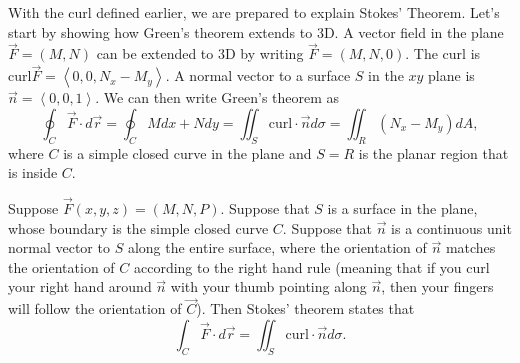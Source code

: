 %

With the curl defined earlier, we are prepared to explain Stokes' Theorem.  Let's start by showing how Green's theorem extends to 3D.
A vector field in the plane $\vec F = \left(M,N\right)$ can be extended to 3D by writing $\vec F = \left(M,N,0\right)$.  The curl is $\text{curl}\vec F = \left<0,0,N_x-M_y\right>$.  A normal vector to a surface $S$ in the $xy$ plane is $\vec n = \left<0,0,1\right>$. We can then write Green's theorem as $$\oint_C\vec F\cdot d\vec r = \oint_C Mdx+Ndy = \iint_S \text{curl}\cdot \vec n d\sigma = \iint_R \left(N_x-M_y\right) dA, $$ where $C$ is a simple closed curve in the plane and $S=R$ is the planar region that is inside $C$. 

\begin{theorem}
Suppose $\vec F(x,y,z) = (M,N,P)$.  Suppose that $S$ is a surface in the plane, whose boundary is the simple closed curve $C$. Suppose that $\vec n$ is a continuous unit normal vector to $S$ along the entire surface, where the orientation of $\vec n$ matches the orientation of $C$ according to the right hand rule (meaning that if you curl your right hand around $\vec n$ with your thumb pointing along $\vec n$, then your fingers will follow the orientation of $\vec C$). Then Stokes' theorem states that 
$$\int_C\vec F\cdot d\vec r = \iint_S \text{curl}\cdot \vec n d\sigma .$$
\end{theorem}


